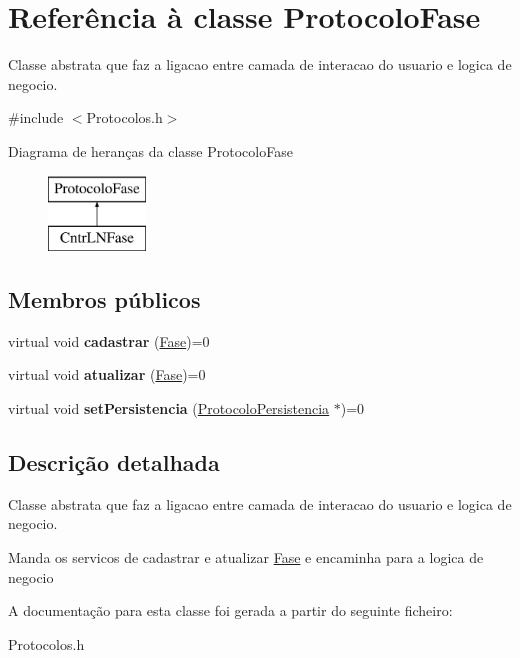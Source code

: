 \hypertarget{class_protocolo_fase}{
\section{\-Referência à classe \-Protocolo\-Fase}
\label{class_protocolo_fase}
}


\-Classe abstrata que faz a ligacao entre camada de interacao do usuario e logica de negocio.  




{\ttfamily \#include $<$\-Protocolos.\-h$>$}

\-Diagrama de heranças da classe \-Protocolo\-Fase\begin{figure}[H]
\begin{center}
\leavevmode
\includegraphics[height=2.000000cm]{class_protocolo_fase}
\end{center}
\end{figure}
\subsection*{\-Membros públicos}
\begin{DoxyCompactItemize}
\item 
\hypertarget{class_protocolo_fase_aac28718e85013963a84bb2ba5388e33f}{
virtual void {\bfseries cadastrar} (\hyperlink{class_fase}{\-Fase})=0}
\label{class_protocolo_fase_aac28718e85013963a84bb2ba5388e33f}

\item 
\hypertarget{class_protocolo_fase_a6237c5adc12aa6e5e5b2326b46d09b23}{
virtual void {\bfseries atualizar} (\hyperlink{class_fase}{\-Fase})=0}
\label{class_protocolo_fase_a6237c5adc12aa6e5e5b2326b46d09b23}

\item 
\hypertarget{class_protocolo_fase_ac062b94f702308fb107af10004ff8b6f}{
virtual void {\bfseries set\-Persistencia} (\hyperlink{class_protocolo_persistencia}{\-Protocolo\-Persistencia} $\ast$)=0}
\label{class_protocolo_fase_ac062b94f702308fb107af10004ff8b6f}

\end{DoxyCompactItemize}


\subsection{\-Descrição detalhada}
\-Classe abstrata que faz a ligacao entre camada de interacao do usuario e logica de negocio. 

\-Manda os servicos de cadastrar e atualizar \hyperlink{class_fase}{\-Fase} e encaminha para a logica de negocio 

\-A documentação para esta classe foi gerada a partir do seguinte ficheiro\-:\begin{DoxyCompactItemize}
\item 
\-Protocolos.\-h\end{DoxyCompactItemize}
